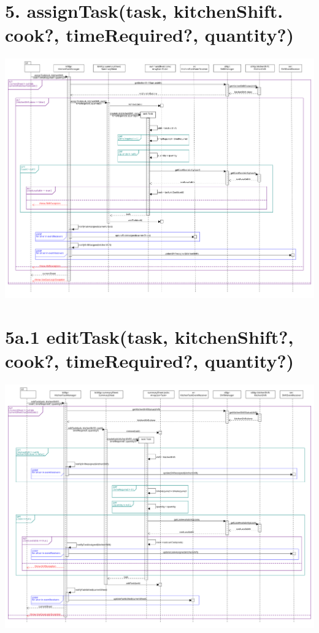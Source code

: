 \pagebreak

\section*{5. assignTask(task, kitchenShift. cook?, timeRequired?, quantity?)}

\begin{center}
  \includegraphics[scale = 0.25]{images/DSD/DSD 5.png}
\end{center}

\pagebreak

\section*{5a.1 editTask(task, kitchenShift?, cook?, timeRequired?, quantity?)}

\begin{center}
  \includegraphics[scale = 0.23]{images/DSD/DSD 5a.png}
\end{center}

